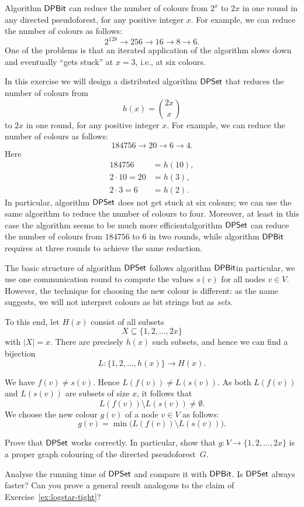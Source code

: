 \begin{exs}\label{ex:dpset}
    Algorithm $\textsf{DPBit}$ can reduce the number of colours from $2^x$ to $2x$ in one round in any directed pseudoforest, for any positive integer $x$. For example, we can reduce the number of colours as follows:
    \[
        2^{128} \to 256 \to 16 \to 8 \to 6.
    \]
    One of the problems is that an iterated application of the algorithm slows down and eventually ``gets stuck'' at $x = 3$, i.e., at six colours.
    
    In this exercise we will design a distributed algorithm $\textsf{DPSet}$ that reduces the number of colours from
    \[
        h(x) = \binom{2x}{x}
    \]
    to $2x$ in one round, for any positive integer $x$. For example, we can reduce the number of colours as follows:
    \[
        184756 \to 20 \to 6 \to 4.
    \]
    Here
    \begin{align*}
        184756 &= h(10), \\
        2 \cdot 10 = 20 &= h(3), \\
        2 \cdot 3 = 6 &= h(2).
    \end{align*}
    In particular, algorithm $\textsf{DPSet}$ does not get stuck at six colours; we can use the same algorithm to reduce the number of colours to four. Moreover, at least in this case the algorithm seems to be much more efficient\mydash algorithm $\textsf{DPSet}$ can reduce the number of colours from $184756$ to $6$ in two rounds, while algorithm $\textsf{DPBit}$ requires at three rounds to achieve the same reduction.
    
    The basic structure of algorithm $\textsf{DPSet}$ follows algorithm $\textsf{DPBit}$\mydash in particular, we use one communication round to compute the values $s(v)$ for all nodes $v \in V$. However, the technique for choosing the new colour is different: as the name suggests, we will not interpret colours as bit strings but as \emph{sets}.
    
    To this end, let $H(x)$ consist of all subsets
    \[
        X \subseteq \{1,2,\dotsc,2x\}
    \]
    with $|X| = x$. There are precisely $h(x)$ such subsets, and hence we can find a bijection
    \[
        L\colon \{1,2,\dotsc,h(x)\} \to H(x).
    \]
    
    We have $f(v) \ne s(v)$. Hence $L(f(v)) \ne L(s(v))$. As both $L(f(v))$ and $L(s(v))$ are subsets of size $x$, it follows that
    \[
        L(f(v)) \setminus L(s(v)) \ne \emptyset.
    \]
    We choose the new colour $g(v)$ of a node $v \in V$ as follows:
    \[
        g(v) = \min \bigl( L(f(v)) \setminus L(s(v)) \bigr).
    \]

    Prove that $\textsf{DPSet}$ works correctly. In particular, show that $g\colon V \to \{1,2,\dotsc,2x\}$ is a proper graph colouring of the directed pseudoforest~$G$.
    
    Analyse the running time of $\textsf{DPSet}$ and compare it with $\textsf{DPBit}$. Is $\textsf{DPSet}$ always faster? Can you prove a general result analogous to the claim of Exercise~\ref{ex:logstar-tight}?
\end{exs}

